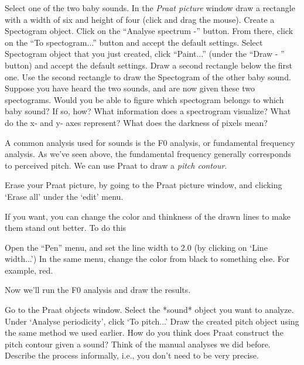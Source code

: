 \documentclass[a4paper, 9pt]{article}
\begin{document}
\begin{exercise}
\action Select one of the two baby sounds.
\action In the \textit{Praat picture} window draw a rectangle with a width of six and height of four (click and drag the mouse).
\action Create a Spectogram object. Click on the ``Analyse spectrum -'' button. From there, click on the ``To spectogram...'' button and accept the default settings.
\action Select Spectogram object that you just created, click ``Paint...'' (under the ``Draw - '' button) and accept the default settings.
\action Draw a second rectangle below the first one. Use the second rectangle to draw the Spectogram of the other baby sound.
\ask Suppose you have heard the two sounds, and are now given these two spectograms. Would you be able to figure which spectogram belongs to which baby sound? If so, how?
\askstar What information does a spectrogram visualize? What do the x- and y- axes represent? What does the darkness of pixels mean?
\end{exercise}

A common analysis used for sounds is the F0 analysis, or fundamental
frequency analysis. As we've seen above, the fundamental frequency
generally corresponds to perceived pitch. We can use Praat to draw a
\emph{pitch contour}.

\begin{exercise}
\action Erase your Praat picture, by going to the Praat picture window, and clicking `Erase all' under the `edit' menu.
\end{exercise}

If you want, you can change the color and thinkness of the drawn lines
to make them stand out better. To do this

\begin{exercise}
\action Open the ``Pen'' menu, and set the line width to 2.0 (by clicking on `Line width...')
\action In the same menu, change the color from black to something else. For example, red. 
\end{exercise}

Now we'll run the F0 analysis and draw the results.

\begin{exercise}
\action Go to the Praat objects window.
\action Select the *sound* object you want to analyze.
\action Under `Analyse periodicity', click `To pitch...'
\action Draw the created pitch object using the same method we used earlier.
\ask How do you think does Praat construct the pitch contour given a sound? Think of the manual analyses we did before. Describe the process informally, i.e., you don't need to be very precise.
\end{exercise}
\end{document}
